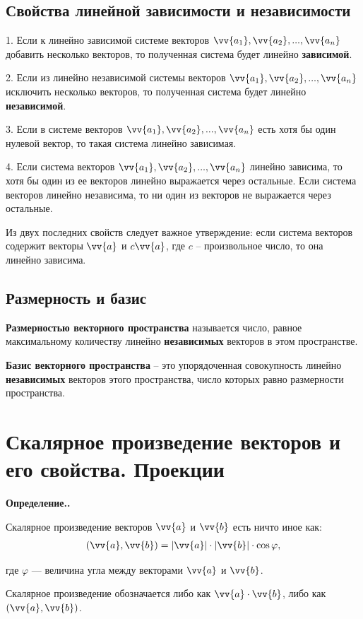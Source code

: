 \documentclass[a4paper,12pt,oneside]{extbook}
\newcommand{\newpar}{$ $\par\nobreak\ignorespaces}
\newenvironment{definition}[1][]{\noindent\textbf{Определение.\if\relax\detokenize{#1}\relax\else\;#1.\fi}\newpar}{\bigskip}
\theoremstyle{numbered}
\theoremstyle{unnumbered}
\theoremstyle{named}
\theoremstyle{unnumbered}
\theoremstyle{named}
\theoremstyle{named}
\theoremstyle{named}
\begin{document}
\subsection{Свойства линейной зависимости и независимости}

1. Если к линейно зависимой системе векторов \(\vv{a_1}, \vv{a_2}, ..., \vv{a_n}\) добавить несколько векторов, то полученная система будет линейно \textbf{зависимой}.

2. Если из линейно независимой системы векторов \(\vv{a_1}, \vv{a_2}, ..., \vv{a_n}\) исключить несколько векторов, то полученная система будет линейно \textbf{независимой}.

3. Если в системе векторов \(\vv{a_1}, \vv{a_2}, ..., \vv{a_n}\) есть хотя бы один нулевой вектор, то такая система линейно зависимая.

4. Если система векторов \(\vv{a_1}, \vv{a_2}, ..., \vv{a_n}\) линейно зависима, то хотя бы один из ее векторов линейно выражается через остальные. Если система векторов линейно независима, то ни один из векторов не выражается через остальные.

Из двух последних свойств следует важное утверждение:
если система векторов содержит векторы \(\vv{a}\) и \(c \vv{a}\), где \(c\) – произвольное число, то она линейно зависима.

\subsection{Размерность и базис}
\textbf{Размерностью векторного пространства} называется число, равное максимальному количеству линейно \textbf{независимых} векторов в этом пространстве.

\textbf{Базис векторного пространства} – это упорядоченная совокупность линейно \textbf{независимых} векторов этого пространства, число которых равно размерности пространства.

\section{Скалярное произведение векторов и его свойства. Проекции}\label{sec:scalar-multiply}

\begin{definition}
    Скалярное произведение векторов \(\vv{a}\) и \(\vv{b}\) есть ничто иное как:
    \begin{gather*}
        (\vv{a}, \vv{b}) = |\vv{a}| \cdot |\vv{b}| \cdot \cos{\varphi},
    \end{gather*}

    где \(\varphi\) — величина угла между векторами \(\vv{a}\) и \(\vv{b}\).

    Скалярное произведение обозначается либо как \(\vv{a} \cdot \vv{b}\), либо как \((\vv{a}, \vv{b})\).
\end{definition}
\end{document}
